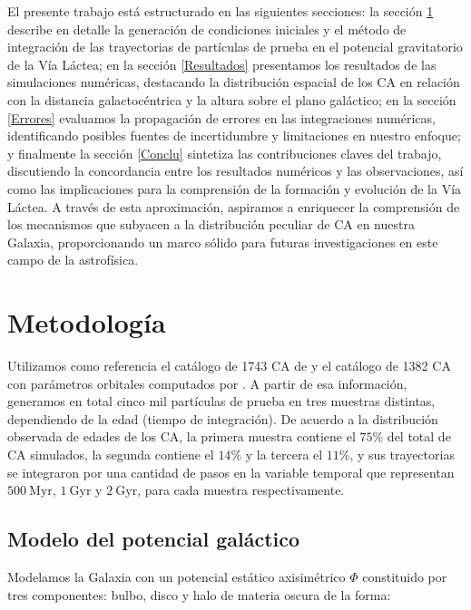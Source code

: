 \documentclass[baaa]{baaa}
\begin{document}
El presente trabajo está estructurado en las siguientes secciones: la sección \ref{Metodo} describe en detalle la generación de condiciones iniciales y el método de integración de las trayectorias de partículas de prueba en el potencial gravitatorio de la Vía Láctea; en la sección \ref{Resultados} presentamos los resultados de las simulaciones numéricas, destacando la distribución espacial de los CA en relación con la distancia galactocéntrica y la altura sobre el plano galáctico; en la sección \ref{Errores} evaluamos la propagación de errores en las integraciones numéricas, identificando posibles fuentes de incertidumbre y limitaciones en nuestro enfoque; y finalmente la sección \ref{Conclu} sintetiza las contribuciones claves del trabajo, discutiendo la concordancia entre los resultados numéricos y las observaciones, así como las implicaciones para la comprensión de la formación y evolución de la Vía Láctea. A través de esta aproximación, aspiramos a enriquecer la comprensión de los mecanismos que subyacen a la distribución peculiar de CA en nuestra Galaxia, proporcionando un marco sólido para futuras investigaciones en este campo de la astrofísica.

\section{Metodología}\label{Metodo}

 Utilizamos como referencia el catálogo de 1743 CA de \cite{Dias} y el catálogo de 1382 CA con parámetros orbitales computados por \cite{Tarricq}. A partir de esa información, generamos en total cinco mil partículas de prueba en tres muestras distintas, dependiendo de la edad (tiempo de integración). De acuerdo a la distribución observada de edades de los CA, la primera muestra contiene el $75\%$ del total de CA simulados, la segunda contiene el $14\%$ y la tercera el $11\%$, y sus trayectorias se integraron por una cantidad de pasos en la variable temporal que representan $500~\mathrm{Myr}$, $1~\mathrm{Gyr}$ y $2~\mathrm{Gyr}$, para cada muestra respectivamente.

\subsection{Modelo del potencial galáctico}\label{potencial}

Modelamos la Galaxia con un potencial estático axisimétrico $\Phi$ constituido por tres componentes: bulbo, disco y halo de materia oscura de la forma:
\end{document}

